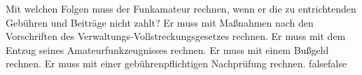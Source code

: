     {Mit welchen Folgen muss der Funkamateur rechnen, wenn er die zu entrichtenden Gebühren und Beiträge nicht zahlt?}
    {Er muss mit Maßnahmen nach den Vorschriften des Verwaltungs-Vollstreckungsgesetzes rechnen.}
    {Er muss mit dem Entzug seines Amateurfunkzeugnisses rechnen.}
    {Er muss mit einem Bußgeld rechnen.}
    {Er muss mit einer gebührenpflichtigen Nachprüfung rechnen.}
    {false}{false}